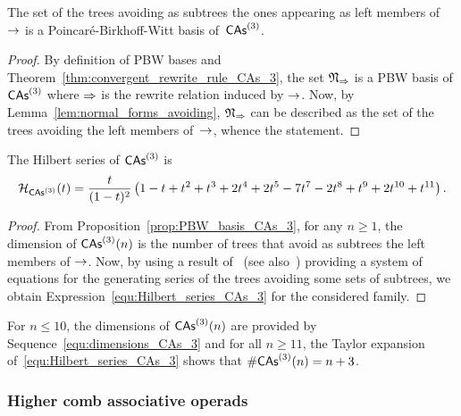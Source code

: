 \begin{Proposition} \label{prop:PBW_basis_CAs_3}
    The set of the trees avoiding as subtrees the ones appearing as
    left members of $\operatorname{\to}$ is a Poincaré-Birkhoff-Witt basis
    of~$\mathsf{CAs}^{\left(3\right)}$.
\end{Proposition}
\begin{proof}
    By definition of PBW bases and
    Theorem~\ref{thm:convergent_rewrite_rule_CAs_3}, the set
    $\mathfrak{N}_{\operatorname{\Rightarrow}}$ is a PBW basis of $\mathsf{CAs}^{\left(3\right)}$ where
    $\operatorname{\Rightarrow}$ is the rewrite relation induced by $\operatorname{\to}$. Now, by
    Lemma~\ref{lem:normal_forms_avoiding}, $\mathfrak{N}_{\operatorname{\Rightarrow}}$
    can be described as the set of the trees avoiding the left members
    of~$\operatorname{\to}$, whence the statement.
\end{proof}
\medbreak

\begin{Proposition} \label{prop:Hilbert_series_CAs_3}
    The Hilbert series of $\mathsf{CAs}^{\left(3\right)}$ is
    \begin{equation} \label{equ:Hilbert_series_CAs_3}
        \mathcal{H}_{\mathsf{CAs}^{\left(3\right)}}(t) = \frac{t}{(1 - t)^2}
        \left(1 - t + t^2 + t^3 + 2t^4 + 2t^5 - 7t^7 - 2t^8 + t^9 +
        2t^{10} + t^{11}\right).
    \end{equation}
\end{Proposition}
\begin{proof}
    From Proposition~\ref{prop:PBW_basis_CAs_3}, for any $n \geq 1$, the
    dimension of $\mathsf{CAs}^{\left(3\right)}(n)$ is the number of trees that avoid as
    subtrees the left members of $\operatorname{\to}$. Now, by using a result
    of~\cite{Gir18} (see also~\cite{Row10,KP15}) providing a system of
    equations for the generating series of the trees avoiding some sets
    of subtrees, we obtain Expression~\eqref{equ:Hilbert_series_CAs_3}
    for the considered family.
\end{proof}
\medbreak

For $n \leq 10$, the dimensions of $\mathsf{CAs}^{\left(3\right)}(n)$ are provided by
Sequence~\eqref{equ:dimensions_CAs_3} and for all $n \geq 11$, the
Taylor expansion of~\eqref{equ:Hilbert_series_CAs_3} shows that
$\# \mathsf{CAs}^{\left(3\right)}(n) = n + 3$.
\medbreak


\subsubsection{Higher comb associative operads}

